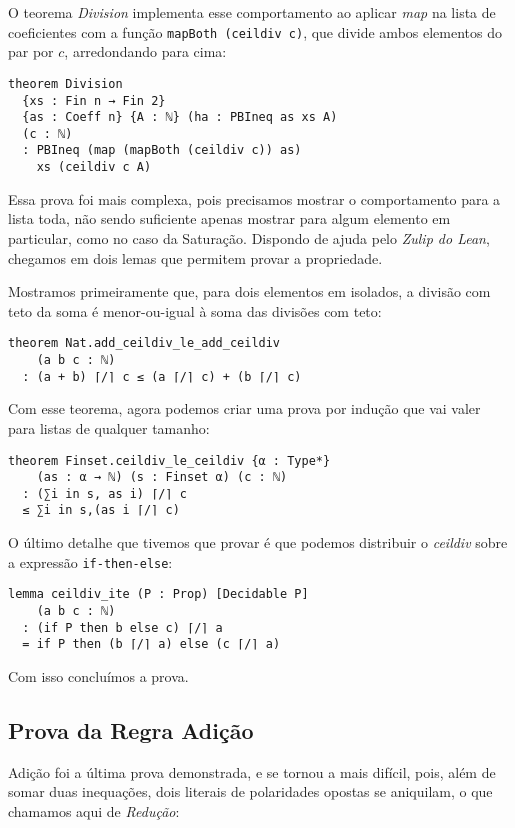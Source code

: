 \documentclass[conference]{IEEEtran}
\begin{document}
O teorema \textit{Division} implementa esse comportamento ao aplicar \textit{map} na lista de coeficientes com a função
\texttt{mapBoth (ceildiv c)}, que divide ambos elementos do par por $c$, arredondando para cima:
\begin{verbatim}
theorem Division
  {xs : Fin n → Fin 2}
  {as : Coeff n} {A : ℕ} (ha : PBIneq as xs A)
  (c : ℕ)
  : PBIneq (map (mapBoth (ceildiv c)) as)
    xs (ceildiv c A)
\end{verbatim}

Essa prova foi mais complexa, pois precisamos mostrar o comportamento para a lista toda,
não sendo suficiente apenas mostrar para algum elemento em particular, como no caso da Saturação.
Dispondo de ajuda pelo \textit{Zulip do Lean}, chegamos em dois lemas que permitem provar a propriedade.

Mostramos primeiramente que, para dois elementos em isolados, a divisão com teto da soma é menor-ou-igual à soma das divisões com teto:
\begin{verbatim}
theorem Nat.add_ceildiv_le_add_ceildiv
    (a b c : ℕ)
  : (a + b) ⌈/⌉ c ≤ (a ⌈/⌉ c) + (b ⌈/⌉ c) 
\end{verbatim}

Com esse teorema, agora podemos criar uma prova por indução que vai valer para listas de qualquer tamanho:
\begin{verbatim}
theorem Finset.ceildiv_le_ceildiv {α : Type*}
    (as : α → ℕ) (s : Finset α) (c : ℕ)
  : (∑i in s, as i) ⌈/⌉ c
  ≤ ∑i in s,(as i ⌈/⌉ c)
\end{verbatim}

O último detalhe que tivemos que provar é que podemos distribuir o \textit{ceildiv} sobre a expressão \texttt{if-then-else}:
\begin{verbatim}
lemma ceildiv_ite (P : Prop) [Decidable P]
    (a b c : ℕ)
  : (if P then b else c) ⌈/⌉ a
  = if P then (b ⌈/⌉ a) else (c ⌈/⌉ a)
\end{verbatim}

Com isso concluímos a prova.



\subsection{Prova da Regra Adição}
Adição foi a última prova demonstrada, e se tornou a mais difícil, pois, além de somar duas inequações,
dois literais de polaridades opostas se aniquilam, o que chamamos aqui de \textit{Redução}:
\end{document}
